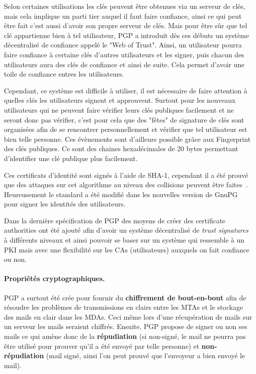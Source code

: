 Selon certaines utilisations les clés peuvent être obtenues via un serveur de clés, mais cela implique un parti tier auquel il faut faire confiance, ainsi ce qui peut être fait c'est aussi d'avoir son propre serveur de clés. Mais pour être sûr que tel clé appartienne bien à tel utilisateur, PGP a introduit dès ces débuts un système décentralisé de confiance appelé le "Web of Trust". Ainsi, un utilisateur pourra faire confiance à certaine clés d'autres utilisateurs et les signer, puis chacun des utilisateurs aura des clés de confiance et ainsi de suite. Cela permet d'avoir une toile de confiance entres les utilisateurs.

Cependant, ce système est difficile à utiliser, il est nécessaire de faire attention à quelles clés les utilisateurs signent et approuvent. Surtout pour les nouveaux utilisateurs qui ne peuvent faire vérifier leurs clés publiques facilement et ne seront donc pas vérifier, c'est pour cela que des "fêtes" de signature de clés sont organisées afin de se rencontrer personnellement et vérifier que tel utilisateur est bien telle personne. Ces évènements sont d'ailleurs possible grâce aux Fingerprint des clés publiques. Ce sont des chaines hexadécimales de 20 bytes permettant d'identifier une clé publique plus facilement.

Ces certificats d'identité sont signés à l'aide de SHA-1, cependant il a été prouvé que des attaques sur cet algorithme au niveau des collisions peuvent être faites~\cite{DBLP:journals/iacr/LeurentP20}. Heureusement le standard a été modifié dans les nouvelles version de GnuPG pour signer les identités des utilisateurs.

Dans la dernière spécification de PGP des moyens de créer des certificate authorities ont été ajouté afin d'avoir un système décentralisé de \textit{trust signatures} à différents niveaux et ainsi pouvoir se baser sur un système qui ressemble à un PKI mais avec une flexibilité sur les CAs (utilisateurs) auxquels on fait confiance ou non.
\paragraph*{Propriétés cryptographiques.}
PGP a surtout été crée pour fournir du \textbf{chiffrement de bout-en-bout} afin de résoudre les problèmes de transmissions en clairs entre les MTAs et le stockage des mails en clair dans les MDAs. Ceci même lors d'une récupération de mails sur un serveur les mails seraient chiffrés. Ensuite, PGP propose de signer ou non ses mails ce qui amène donc de la \textbf{répudiation} (si non-signé, le mail ne pourra pas être utilisé pour prouver qu'il a été envoyé par telle personne) et \textbf{non-répudiation} (mail signé, ainsi l'on peut prouvé que l'envoyeur a bien envoyé le mail).

